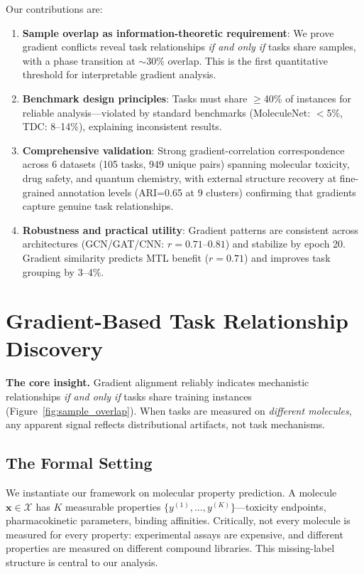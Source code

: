 \documentclass[sigconf,nonacm]{acmart}
\begin{document}
Our contributions are:
\begin{enumerate}
\item \textbf{Sample overlap as information-theoretic requirement}: We prove gradient conflicts reveal task relationships \textit{if and only if} tasks share samples, with a phase transition at $\sim$30\% overlap. This is the first quantitative threshold for interpretable gradient analysis.

\item \textbf{Benchmark design principles}: Tasks must share $\geq$40\% of instances for reliable analysis---violated by standard benchmarks (MoleculeNet: $<$5\%, TDC: 8--14\%), explaining inconsistent results.

\item \textbf{Comprehensive validation}: Strong gradient-correlation correspondence across 6 datasets (105 tasks, 949 unique pairs) spanning molecular toxicity, drug safety, and quantum chemistry, with external structure recovery at fine-grained annotation levels (ARI=0.65 at 9 clusters) confirming that gradients capture genuine task relationships.

\item \textbf{Robustness and practical utility}: Gradient patterns are consistent across architectures (GCN/GAT/CNN: $r=0.71$--$0.81$) and stabilize by epoch 20. Gradient similarity predicts MTL benefit ($r = 0.71$) and improves task grouping by 3--4\%.
\end{enumerate}

\section{Gradient-Based Task Relationship Discovery}

\textbf{The core insight.} Gradient alignment reliably indicates mechanistic relationships \textit{if and only if} tasks share training instances (Figure~\ref{fig:sample_overlap}). When tasks are measured on \textit{different molecules}, any apparent signal reflects distributional artifacts, not task mechanisms.

\subsection{The Formal Setting}

We instantiate our framework on molecular property prediction. A molecule $\mathbf{x} \in \mathcal{X}$ has $K$ measurable properties $\{y^{(1)}, \ldots, y^{(K)}\}$---toxicity endpoints, pharmacokinetic parameters, binding affinities. Critically, not every molecule is measured for every property: experimental assays are expensive, and different properties are measured on different compound libraries. This missing-label structure is central to our analysis.
\end{document}
